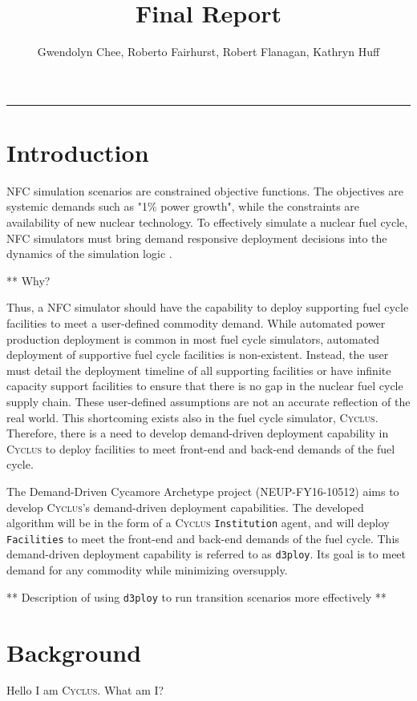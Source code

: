 \documentclass[11pt,letterpaper]{article}
\title{Final Report}
\author{Gwendolyn Chee, Roberto Fairhurst, Robert Flanagan, Kathryn Huff}
\newcommand{\Cyclus}{\textsc{Cyclus}\xspace}%
\newcommand{\deploy}{\texttt{d3ploy}\xspace}%
\begin{document}
	\maketitle
	\hrule


\section{Introduction}
\gls{NFC} simulation scenarios are constrained objective functions. 
The objectives are systemic demands such as "1\% power growth", 
while the constraints are availability of new nuclear technology.
To effectively simulate a nuclear fuel cycle, \gls{NFC} simulators 
must bring demand responsive deployment decisions into the dynamics
of the simulation logic \cite{huff_current_2017}. 

** Why? 

Thus, a \gls{NFC} simulator should have the capability to deploy 
supporting fuel cycle facilities to meet a user-defined commodity
demand. 
While automated power production deployment is common in most fuel
cycle simulators, automated deployment of supportive fuel cycle 
facilities is non-existent. 
Instead, the user must detail the deployment timeline of all 
supporting facilities or have infinite capacity support facilities
to ensure that there is no gap in the nuclear fuel cycle supply 
chain. 
These user-defined assumptions are not an accurate reflection 
of the real world. 
This shortcoming exists also in the fuel cycle simulator, \Cyclus. 
Therefore, there is a need to develop demand-driven deployment 
capability in \Cyclus to deploy facilities to meet front-end and 
back-end demands of the fuel cycle.

The Demand-Driven Cycamore Archetype project (NEUP-FY16-10512) 
aims to develop \Cyclus's demand-driven deployment capabilities. 
The developed algorithm will be in the form of a \Cyclus 
\texttt{Institution} agent, and will deploy \texttt{Facilities} 
to meet the front-end and back-end demands of the fuel cycle.
This demand-driven deployment capability is referred to as 
\deploy. 
Its goal is to meet demand for any commodity while minimizing 
oversupply. 

** Description of using \deploy to run transition scenarios more effectively ** 

\section{Background}
Hello I am \Cyclus. What am I? 
\end{document}
